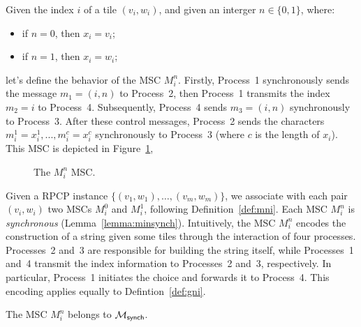 \begin{definition}[$M^n_i$]\label{def:mni}
	Given the index $i$ of a tile $(v_i, w_i)$, and
	given an interger $n\in\{0,1\}$, where:
	\begin{itemize}
		\item if $n=0$, then $x_i=v_i$;
		\item if $n=1$, then $x_i=w_i$;
	\end{itemize}
	let's define the behavior of the MSC $M^n_i$.
	Firstly, Process~1 synchronously sends the message
	$m_1 = (i, n)$ to Process~2, then Process~1 transmits the index $m_2=i$
	to Process~4. Subsequently, Process~4 sends $m_3 = (i, n)$
	synchronously to Process~3. After these control messages, Process~2
	sends the characters $m_i^1 = x_i^1,..., m_i^c = x_i^c$
	synchronously to Process~3 (where $c$ is the length of $x_i$).
	This MSC is depicted in Figure~\ref{fig:mni}, 

	\begin{figure}[!ht]
		\centering
		\begin{msc}[draw frame=none, draw head=none, msc keyword=, head height=0px, label distance=0.5ex, foot height=0px, foot distance=0px]{}

		\end{msc}
		\caption{The $M_i^n$ MSC.}
		\label{fig:mni}
	\end{figure}

\end{definition}

Given a RPCP instance $\{(v_1,w_1),\ldots,(v_m,w_m)\}$, we associate  
with each pair $(v_i,w_i)$ two MSCs $M^0_i$ and $M^1_i$, following  
Definition~\ref{def:mni}. Each MSC $M^n_i$ is \emph{synchronous}  
(Lemma~\ref{lemma:minsynch}). Intuitively, the MSC $M_i^n$ encodes the  
construction of a string given some tiles through the interaction of four processes.  
Processes~2 and~3 are responsible for building the string itself,  
while Processes~1 and~4 transmit the index information to Processes~2  
and~3, respectively. In particular, Process~1 initiates the choice and  
forwards it to Process~4. This encoding applies equally to Defintion~\ref{def:gni}.

\bigskip

\begin{lemma}\label{lemma:minsynch}
	The MSC $M_i^n$ belongs to $\mathcal{M}_{\mathsf{synch}}$.
\end{lemma}

